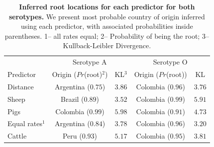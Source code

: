 \documentclass[10pt]{article}
\begin{document}
\newpage
\begin{table}[H]
\caption{
\textbf{Inferred root locations for each predictor for both serotypes.} We present most probable country of origin inferred using each predictor, with associated probabilities inside parentheses. 1-- all rates equal; 2-- Probability of being the root; 3-- Kullback-Leibler Divergence.
}
\begin{center}
\begin{tabular}{lcccc}
\toprule
& \multicolumn{2}{c}{Serotype A}&\multicolumn{2}{c}{Serotype O}\\
Predictor& Origin ($Pr$(root)$^2$)& KL$^3$&Origin ($Pr$(root))& KL\\
\midrule
Distance & Argentina ($0.75$)& $3.86$ & Colombia ($0.96$)& $3.76$\\
Sheep    & Brazil ($0.89$) & $3.52$ & Colombia ($0.99$)& $5.91$\\
Pigs      & Colombia ($0.99$)& $5.98$& Colombia ($0.91$)& $4.73$\\
Equal rates$^1$  & Argentina ($0.84$)& $3.78$ &Colombia  ($0.96$)& $3.20$\\
Cattle   & Peru ($0.93$)& $5.17$ & Colombia ($0.95$)& $3.81$\\
 \bottomrule
\end{tabular}
\end{center}
\begin{flushleft}
\end{flushleft}
\label{tab:roots}
 \end{table}
\end{document}
